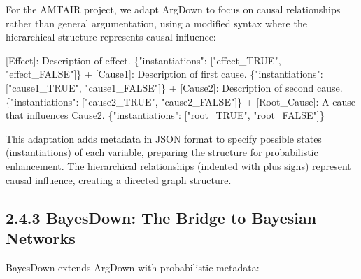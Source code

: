 \documentclass[
  11pt,
  letterpaper,
]{book}
\newenvironment{Shaded}{\begin{snugshade}}{\end{snugshade}}
\newcommand{\DataTypeTok}[1]{\textcolor[rgb]{0.68,0.00,0.00}{#1}}
\newcommand{\ErrorTok}[1]{\textcolor[rgb]{0.68,0.00,0.00}{#1}}
\newcommand{\FunctionTok}[1]{\textcolor[rgb]{0.28,0.35,0.67}{#1}}
\newcommand{\OtherTok}[1]{\textcolor[rgb]{0.00,0.23,0.31}{#1}}
\newcommand{\StringTok}[1]{\textcolor[rgb]{0.13,0.47,0.30}{#1}}
\begin{document}
For the AMTAIR project, we adapt ArgDown to focus on causal
relationships rather than general argumentation, using a modified syntax
where the hierarchical structure represents causal influence:

\begin{Shaded}
\begin{Highlighting}[]
\OtherTok{[}\ErrorTok{Effect}\OtherTok{]}\ErrorTok{:} \ErrorTok{Description} \ErrorTok{of} \ErrorTok{effect.} \FunctionTok{\{}\DataTypeTok{"instantiations"}\FunctionTok{:} \OtherTok{[}\StringTok{"effect\_TRUE"}\OtherTok{,} \StringTok{"effect\_FALSE"}\OtherTok{]}\FunctionTok{\}}
 \ErrorTok{+} \OtherTok{[}\ErrorTok{Cause1}\OtherTok{]}\ErrorTok{:} \ErrorTok{Description} \ErrorTok{of} \ErrorTok{first} \ErrorTok{cause.} \FunctionTok{\{}\DataTypeTok{"instantiations"}\FunctionTok{:} \OtherTok{[}\StringTok{"cause1\_TRUE"}\OtherTok{,} \StringTok{"cause1\_FALSE"}\OtherTok{]}\FunctionTok{\}}
 \ErrorTok{+} \OtherTok{[}\ErrorTok{Cause2}\OtherTok{]}\ErrorTok{:} \ErrorTok{Description} \ErrorTok{of} \ErrorTok{second} \ErrorTok{cause.} \FunctionTok{\{}\DataTypeTok{"instantiations"}\FunctionTok{:} \OtherTok{[}\StringTok{"cause2\_TRUE"}\OtherTok{,} \StringTok{"cause2\_FALSE"}\OtherTok{]}\FunctionTok{\}}
   \ErrorTok{+} \OtherTok{[}\ErrorTok{Root\_Cause}\OtherTok{]}\ErrorTok{:} \ErrorTok{A} \ErrorTok{cause} \ErrorTok{that} \ErrorTok{influences} \ErrorTok{Cause2.} \FunctionTok{\{}\DataTypeTok{"instantiations"}\FunctionTok{:} \OtherTok{[}\StringTok{"root\_TRUE"}\OtherTok{,} \StringTok{"root\_FALSE"}\OtherTok{]}\FunctionTok{\}}
\end{Highlighting}
\end{Shaded}

This adaptation adds metadata in JSON format to specify possible states
(instantiations) of each variable, preparing the structure for
probabilistic enhancement. The hierarchical relationships (indented with
plus signs) represent causal influence, creating a directed graph
structure.

\subsection*{2.4.3 BayesDown: The Bridge to Bayesian
Networks}\label{sec-bayesdown}

BayesDown extends ArgDown with probabilistic metadata:
\end{document}

